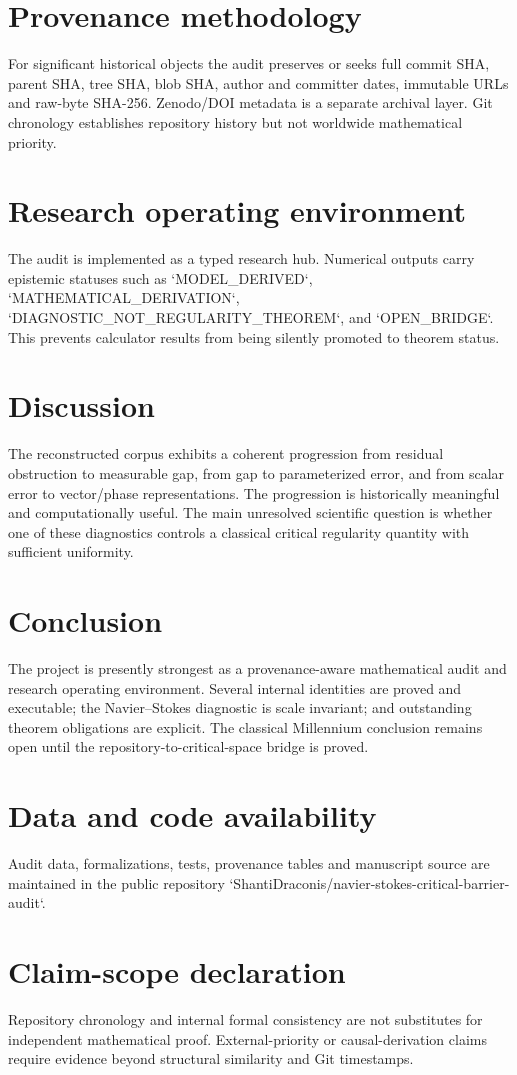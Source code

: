 \documentclass[11pt]{article}
\begin{document}
\section{Provenance methodology}
For significant historical objects the audit preserves or seeks full commit SHA, parent SHA, tree SHA, blob SHA, author and committer dates, immutable URLs and raw-byte SHA-256. Zenodo/DOI metadata is a separate archival layer. Git chronology establishes repository history but not worldwide mathematical priority.

\section{Research operating environment}
The audit is implemented as a typed research hub. Numerical outputs carry epistemic statuses such as `MODEL\_DERIVED`, `MATHEMATICAL\_DERIVATION`, `DIAGNOSTIC\_NOT\_REGULARITY\_THEOREM`, and `OPEN\_BRIDGE`. This prevents calculator results from being silently promoted to theorem status.

\section{Discussion}
The reconstructed corpus exhibits a coherent progression from residual obstruction to measurable gap, from gap to parameterized error, and from scalar error to vector/phase representations. The progression is historically meaningful and computationally useful. The main unresolved scientific question is whether one of these diagnostics controls a classical critical regularity quantity with sufficient uniformity.

\section{Conclusion}
The project is presently strongest as a provenance-aware mathematical audit and research operating environment. Several internal identities are proved and executable; the Navier--Stokes diagnostic is scale invariant; and outstanding theorem obligations are explicit. The classical Millennium conclusion remains open until the repository-to-critical-space bridge is proved.

\section*{Data and code availability}
Audit data, formalizations, tests, provenance tables and manuscript source are maintained in the public repository `ShantiDraconis/navier-stokes-critical-barrier-audit`.

\section*{Claim-scope declaration}
Repository chronology and internal formal consistency are not substitutes for independent mathematical proof. External-priority or causal-derivation claims require evidence beyond structural similarity and Git timestamps.
\end{document}
